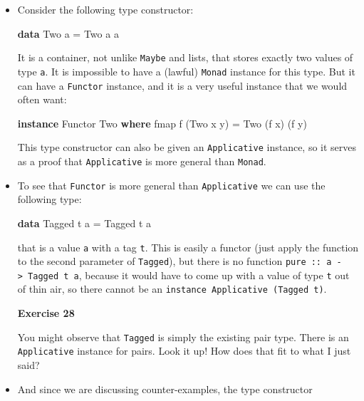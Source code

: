 \documentclass[11pt,
  american,
  DIV13]{article}
\newenvironment{Shaded}{}{}
\newcommand{\DataTypeTok}[1]{\textcolor[rgb]{0.56,0.13,0.00}{#1}}
\newcommand{\FunctionTok}[1]{\textcolor[rgb]{0.02,0.16,0.49}{#1}}
\newcommand{\KeywordTok}[1]{\textcolor[rgb]{0.00,0.44,0.13}{\textbf{#1}}}
\newcommand{\NormalTok}[1]{#1}
\newcommand{\OtherTok}[1]{\textcolor[rgb]{0.00,0.44,0.13}{#1}}
\begin{document}
\begin{itemize}
\item
  Consider the following type constructor:

\begin{Shaded}
\begin{Highlighting}[]
\KeywordTok{data} \DataTypeTok{Two}\NormalTok{ a }\OtherTok{=} \DataTypeTok{Two}\NormalTok{ a a}
\end{Highlighting}
\end{Shaded}

  It is a container, not unlike \texttt{Maybe} and lists, that stores
  exactly two values of type \texttt{a}. It is impossible to have a
  (lawful) \texttt{Monad} instance for this type. But it can have a
  \texttt{Functor} instance, and it is a very useful instance that we
  would often want:

\begin{Shaded}
\begin{Highlighting}[]
\KeywordTok{instance} \DataTypeTok{Functor} \DataTypeTok{Two} \KeywordTok{where} \FunctionTok{fmap}\NormalTok{ f (}\DataTypeTok{Two}\NormalTok{ x y) }\OtherTok{=} \DataTypeTok{Two}\NormalTok{ (f x) (f y)}
\end{Highlighting}
\end{Shaded}

  This type constructor can also be given an \texttt{Applicative}
  instance, so it serves as a proof that \texttt{Applicative} is more
  general than \texttt{Monad}.
\item
  To see that \texttt{Functor} is more general than \texttt{Applicative}
  we can use the following type:

\begin{Shaded}
\begin{Highlighting}[]
\KeywordTok{data} \DataTypeTok{Tagged}\NormalTok{ t a }\OtherTok{=} \DataTypeTok{Tagged}\NormalTok{ t a}
\end{Highlighting}
\end{Shaded}

  that is a value \texttt{a} with a tag \texttt{t}. This is easily a
  functor (just apply the function to the second parameter of
  \texttt{Tagged}), but there is no function
  \texttt{pure\ ::\ a\ -\textgreater{}\ Tagged\ t\ a}, because it would
  have to come up with a value of type \texttt{t} out of thin air, so
  there cannot be an \texttt{instance\ Applicative\ (Tagged\ t)}.

  \textbf{Exercise 28}

  You might observe that \texttt{Tagged} is simply the existing pair
  type. There is an \texttt{Applicative} instance for pairs. Look it up!
  How does that fit to what I just said?
\item
  And since we are discussing counter-examples, the type constructor


\end{itemize}
\end{document}
